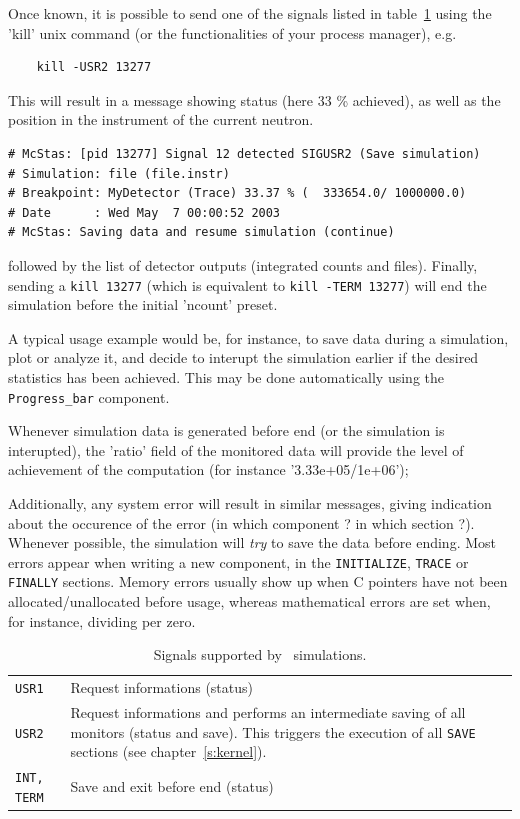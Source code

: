 Once known, it is possible to send one of the signals listed in table~\ref{t:signals} using the 'kill' unix command (or the functionalities of your process manager), e.g.
\begin{verbatim}
    kill -USR2 13277
\end{verbatim}
This will result in a message showing status (here 33 \% achieved), as well as the position in the instrument of the current neutron. 
\begin{verbatim}
# McStas: [pid 13277] Signal 12 detected SIGUSR2 (Save simulation)
# Simulation: file (file.instr)
# Breakpoint: MyDetector (Trace) 33.37 % (  333654.0/ 1000000.0)
# Date      : Wed May  7 00:00:52 2003
# McStas: Saving data and resume simulation (continue)
\end{verbatim}
followed by the list of detector outputs (integrated counts and files). Finally, sending a \verb+kill 13277+ (which is equivalent to \verb+kill -TERM 13277+) will end the simulation before the initial 'ncount' preset.

A typical usage example would be, for instance, to save data during a
simulation, plot or analyze it, and decide to interupt the simulation
earlier if the desired statistics has been achieved. This may be done automatically using the \verb+Progress_bar+ component.

Whenever simulation data is generated before end (or the simulation is interupted), the 'ratio' field of the monitored data will provide the level of achievement of the computation (for instance '3.33e+05/1e+06');

Additionally, any system error will result in similar messages, giving indication about the occurence of the error (in which component ? in which section ?). Whenever possible, the simulation will {\em try} to save the data before ending. Most errors appear when writing a new component, in the \texttt{INITIALIZE}, \texttt{TRACE} or \texttt{FINALLY} sections. Memory errors usually show up when C pointers have not been allocated/unallocated before usage, whereas mathematical errors are set when, for instance, dividing per zero.

\begin{table}
  \begin{center}
    {\let\my=\\
    \begin{tabular}{|p{}|p{}|}
      \hline
      \texttt{USR1} & Request informations (status)  \\
      \texttt{USR2} & Request informations and performs an intermediate saving of all monitors (status and save). This triggers the execution of all \texttt{SAVE} sections (see chapter~\ref{s:kernel}).  \\
      \texttt{INT, TERM} & Save and exit before end (status)  \\
      \hline
    \end{tabular}
    \caption{Signals supported by \MCS\ simulations.}
    \label{t:signals}
    }
  \end{center}
\end{table}


